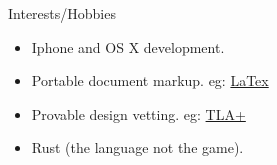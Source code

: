 \documentclass[11pt,oneside]{article}
\newenvironment{ressection}[1]{
        \vspace{4pt}
        {\fontfamily{phv}\selectfont\Large#1}
        \begin{itemize}
        \vspace{3pt}
}{
        \end{itemize}
}
\newcommand{\resitem}[1]{
        \vspace{-4pt}
        \item \begin{flushleft} #1 \end{flushleft}
}
\begin{document}
\begin{ressection}{Interests/Hobbies}

  \resitem{Iphone and OS X development.}

  \resitem{Portable document markup. eg: \href{https://github.com/jstelzer/Resume/blob/master/stelzer-res.tex}{LaTex}}
  
  \resitem{Provable design vetting. eg: \href{https://lamport.azurewebsites.net/tla/high-level-view.html}{TLA+}}
  
  \resitem{Rust (the language not the game). }

\end{ressection}
\end{document}
